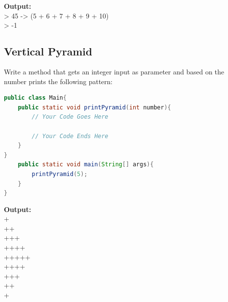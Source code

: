 \documentclass[12pt , a4paper]{article}
\begin{document}
	\begin{tcolorbox}
	\textbf{Output:}\\
	 > 45 -> (5 + 6 + 7 + 8 + 9 + 10) \\
	 > -1\\
	\end{tcolorbox}

	\newpage
	\subsection{Vertical Pyramid}
Write a method that gets an integer input as parameter and based on the number prints the following pattern:
	\begin{lstlisting}[language=Java]
public class Main{
	public static void printPyramid(int number){
		// Your Code Goes Here

		// Your Code Ends Here
	}
}
	public static void main(String[] args){
		printPyramid(5);
	}
}
	\end{lstlisting}

	\begin{tcolorbox}
	\textbf{Output:}\\
	+\\
	++\\
	+++\\
	++++\\
	+++++\\
	++++\\
	+++\\
	++\\
	+
	\end{tcolorbox}

	\newpage
\end{document}

